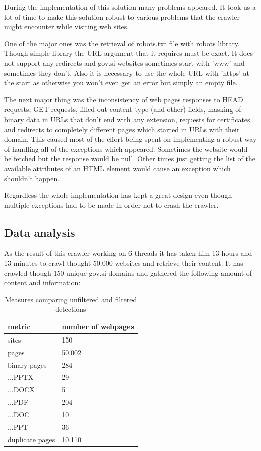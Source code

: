\documentclass[9pt]{IEEEtran}
\begin{document}
During the implementation of this solution many problems appeared.
It took us a lot of time to make this solution robust to various problems that the crawler might encounter while visiting web sites.

One of the major ones was the retrieval of robots.txt file with robots library. 
Though simple library the URL argument that it requires must be exact.
It does not support any redirects and gov.si websites sometimes start with 'www' and sometimes they don't. 
Also it is necessary to use the whole URL with 'https' at the start as otherwise you won't even get an error but simply an empty file.

The next major thing was the inconsistency of web pages responses to HEAD requests, GET requests, filled out content type (and other) fields, masking of binary data in URLs that don't end with any extension, requests for certificates and redirects to completely different pages which started in URLs with their domain.
This caused most of the effort being spent on implementing a robust way of handling all of the exceptions which appeared. 
Sometimes the website would be fetched but the response would be null.
Other times just getting the list of the available attributes of an HTML element would cause an exception which shouldn't happen.

Regardless the whole implementation has kept a great design even though multiple exceptions had to be made in order not to crash the crawler.

\subsection{Data analysis}

As the result of this crawler working on 6 threads it has taken him 13 hours and 13 minutes to crawl thought 50.000 websites and retrieve their content.
It has crawled though 150 unique gov.si domains and gathered the following amount of content and information:

\begin{table}[ht]{}
\begin{tabu} to 1.0\columnwidth { | X[l] | X[l] | }
\hline
metric & number of webpages  \\
\hline
sites & 150 \\
\hline
pages & 50.002 \\
\hline
binary pages & 284 \\
\hline
...PPTX & 29 \\
\hline
...DOCX & 5 \\
\hline
...PDF & 204 \\
\hline
...DOC & 10 \\
\hline
...PPT & 36 \\
\hline
duplicate pages & 10.110 \\
\hline
\end{tabu}
\caption{Measures comparing unfiltered and filtered detections}
\label{tab2}
\end{table}
\end{document}
